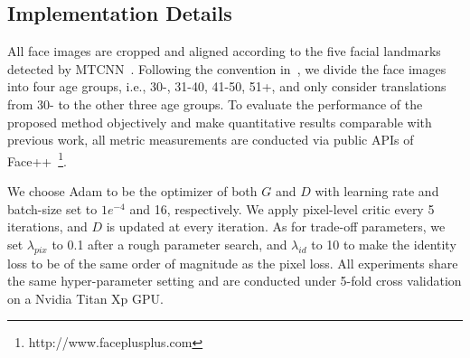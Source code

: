 \documentclass[letterpaper]{article} %
\begin{document}
\subsection{Implementation Details}
All face images are cropped and aligned according to the five facial landmarks detected by MTCNN~\cite{zhang2016joint}. 
Following the convention in~\cite{yang2017learning,li2018global}, we divide the face images into four age groups, i.e., 30-, 31-40, 41-50, 51+, and only consider translations from 30- to the other three age groups.
To evaluate the performance of the proposed method objectively and make quantitative results comparable with previous work, all metric measurements are conducted via public APIs of Face++~\footnote{http://www.faceplusplus.com}.

We choose Adam to be the optimizer of both $G$ and $D$ with learning rate and batch-size set to $1e^{-4}$ and 16, respectively. 
We apply pixel-level critic every 5 iterations, and $D$ is updated at every iteration. 
As for trade-off parameters, we set $\lambda_{pix}$ to 0.1 after a rough parameter search, and $\lambda_{id}$ to 10 to make the identity loss to be of the same order of magnitude as the pixel loss.
All experiments share the same hyper-parameter setting and are conducted under 5-fold cross validation on a Nvidia Titan Xp GPU.
\end{document}
